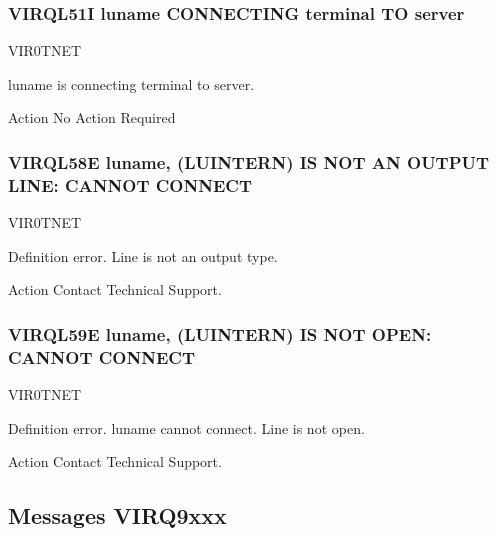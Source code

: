 \documentclass[letterpaper,10pt,english]{sphinxmanual}
\begin{document}
\subsubsection{VIRQL51I luname CONNECTING terminal TO server}
\label{\detokenize{messages:virql51i-luname-connecting-terminal-to-server}}\begin{description}
\sphinxAtStartPar
VIR0TNET

\sphinxAtStartPar
luname is connecting terminal to server.

\end{description}

\sphinxAtStartPar
Action
No Action Required


\subsubsection{VIRQL58E luname, (LUINTERN) IS NOT AN OUTPUT LINE: CANNOT CONNECT}
\label{\detokenize{messages:virql58e-luname-luintern-is-not-an-output-line-cannot-connect}}\begin{description}
\sphinxAtStartPar
VIR0TNET

\sphinxAtStartPar
Definition error. Line is not an output type.

\end{description}

\sphinxAtStartPar
Action
Contact Technical Support.


\subsubsection{VIRQL59E luname, (LUINTERN) IS NOT OPEN: CANNOT CONNECT}
\label{\detokenize{messages:virql59e-luname-luintern-is-not-open-cannot-connect}}\begin{description}
\sphinxAtStartPar
VIR0TNET

\sphinxAtStartPar
Definition error. luname cannot connect. Line is not open.

\end{description}

\sphinxAtStartPar
Action
Contact Technical Support.


\subsection{Messages VIRQ9xxx}
\label{\detokenize{messages:messages-virq9xxx}}
\end{document}
